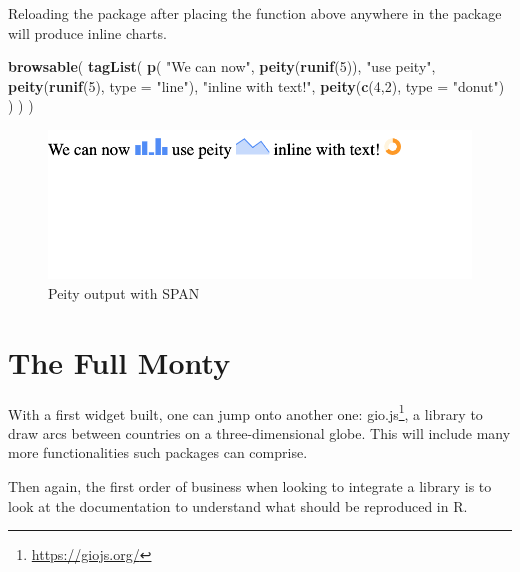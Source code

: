 \documentclass[
]{krantz}
\makeatletter
\newenvironment{Shaded}{\begin{snugshade}}{\end{snugshade}}
\newcommand{\DataTypeTok}[1]{\textcolor[rgb]{0.27,0.27,0.27}{#1}}
\newcommand{\DecValTok}[1]{\textcolor[rgb]{0.06,0.06,0.06}{#1}}
\newcommand{\KeywordTok}[1]{\textcolor[rgb]{0.27,0.27,0.27}{\textbf{#1}}}
\newcommand{\NormalTok}[1]{#1}
\newcommand{\StringTok}[1]{\textcolor[rgb]{0.5,0.5,0.5}{#1}}
\renewcommand{\href}[2]{#2\footnote{\url{#1}}}
\newenvironment{kframe}{%
\medskip{}
\setlength{\fboxsep}{.8em}
 \def\at@end@of@kframe{}%
 \ifinner\ifhmode%
  \def\at@end@of@kframe{\end{minipage}}%
  \begin{minipage}{\columnwidth}%
 \fi\fi%
 \def\FrameCommand##1{\hskip\@totalleftmargin \hskip-\fboxsep
 \colorbox{shadecolor}{##1}\hskip-\fboxsep
     \hskip-\linewidth \hskip-\@totalleftmargin \hskip\columnwidth}%
 \MakeFramed {\advance\hsize-\width
   \@totalleftmargin\z@ \linewidth\hsize
   \@setminipage}}%
 {\par\unskip\endMakeFramed%
 \at@end@of@kframe}
\renewenvironment{Shaded}{\begin{kframe}}{\end{kframe}}
\makeatother
\begin{document}
Reloading the package after placing the function above anywhere in the package will produce inline charts.

\begin{Shaded}
\begin{Highlighting}[]
\KeywordTok{browsable}\NormalTok{(}
  \KeywordTok{tagList}\NormalTok{(}
    \KeywordTok{p}\NormalTok{(}
      \StringTok{"We can now"}\NormalTok{, }\KeywordTok{peity}\NormalTok{(}\KeywordTok{runif}\NormalTok{(}\DecValTok{5}\NormalTok{)),}
      \StringTok{"use peity"}\NormalTok{, }\KeywordTok{peity}\NormalTok{(}\KeywordTok{runif}\NormalTok{(}\DecValTok{5}\NormalTok{), }\DataTypeTok{type =} \StringTok{"line"}\NormalTok{),}
      \StringTok{"inline with text!"}\NormalTok{,}
      \KeywordTok{peity}\NormalTok{(}\KeywordTok{c}\NormalTok{(}\DecValTok{4}\NormalTok{,}\DecValTok{2}\NormalTok{), }\DataTypeTok{type =} \StringTok{"donut"}\NormalTok{)}
\NormalTok{    )}
\NormalTok{  )}
\NormalTok{)}
\end{Highlighting}
\end{Shaded}

\begin{figure}[t]

{\centering \includegraphics[width=1\linewidth]{images/peity-span} 

}

\caption{Peity output with SPAN}\label{fig:peity-spans}
\end{figure}

\hypertarget{widgets-full}{%
\chapter{The Full Monty}\label{widgets-full}}

With a first widget built, one can jump onto another one: \href{https://giojs.org/}{gio.js}, a library to draw arcs between countries on a three-dimensional globe. This will include many more functionalities such packages can comprise.

Then again, the first order of business when looking to integrate a library is to look at the documentation to understand what should be reproduced in R.
\end{document}

